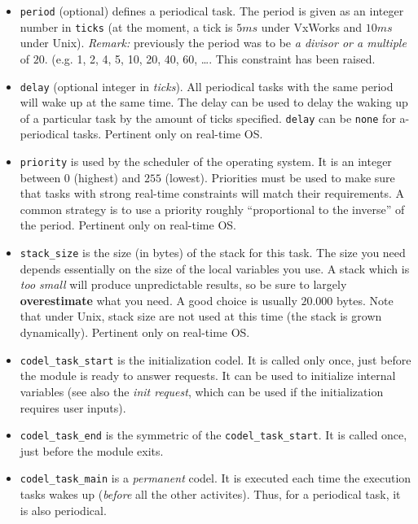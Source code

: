\begin{itemize}
\item \texttt{period} (optional) defines a periodical task. The period is
given as an integer number in \texttt{ticks} (at the moment, a tick is $5ms$
under VxWorks and $10ms$ under Unix). \emph{Remark:} previously the period was to be 
\emph{a divisor or a multiple} of $20$. (e.g. 1, 2, 4, 5, 10, 20, 40, 60,
\ldots. This constraint has been raised.

\item \texttt{delay} (optional integer in \emph{ticks}). All periodical
tasks with the same period  will wake up at the  same time. The delay can
be used to delay the waking up of a particular task  by the amount of ticks 
specified. \texttt{delay} can be \texttt{none} for  a-periodical tasks. Pertinent only on real-time OS.

\item \texttt{priority} is used by the scheduler of the operating system. It
is an integer  between $0$ (highest) and  $255$ (lowest). Priorities must
be used to make  sure that tasks  with strong real-time constraints  will
match their requirements.  A common strategy is to use a priority roughly
``proportional to the inverse'' of the period. Pertinent only on real-time OS.

\item \texttt{stack\_size} is the size (in bytes) of the stack for this
task. The size you  need  depends essentially on   the size of the  local
variables you  use.  A   stack which  is \emph{too small} will   produce
unpredictable results, so be sure  to largely \textbf{overestimate} what you
need.   A  good choice is  usually   $20.000$  bytes. Note that under
Unix, stack size are not used at this time (the stack is grown dynamically).  Pertinent only on real-time OS.

\item \texttt{codel\_task\_start} is the initialization codel. It is called only
once, just before the module is ready to answer requests.  It can be used
to initialize internal variables (see also  the \emph{init request}, which
can be used if the initialization requires user inputs).

\item \texttt{codel\_task\_end} is the symmetric of the \texttt{codel\_task\_start}. It
is called once, just before the module exits.

\item \texttt{codel\_task\_main} is a \emph{permanent} codel. It is executed each time
the execution tasks wakes  up (\emph{before} all the other activites). Thus, for  a  periodical task, it is  also
periodical.


\end{itemize}
